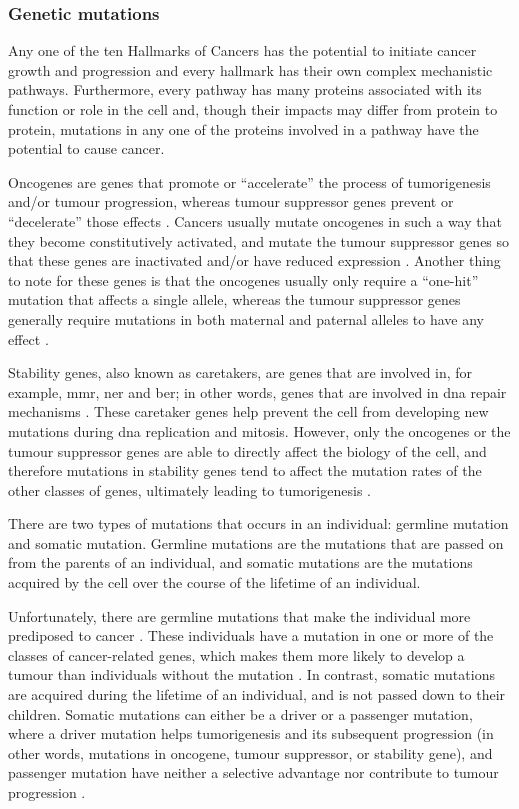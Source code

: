 \subsubsection{Genetic mutations}
\label{ssub:Genetic mutations}

Any one of the ten Hallmarks of Cancers has the potential to initiate cancer growth and progression and every hallmark has their own complex mechanistic pathways.
Furthermore, every pathway has many proteins associated with its function or role in the cell and, though their impacts may differ from protein to protein, mutations in any one of the proteins involved in a pathway have the potential to cause cancer.

Oncogenes are genes that promote or ``accelerate'' the process of tumorigenesis and/or tumour progression, whereas tumour suppressor genes prevent or ``decelerate'' those effects \citep{Vogelstein2004a}.
Cancers usually mutate oncogenes in such a way that they become constitutively activated, and mutate the tumour suppressor genes so that these genes are inactivated and/or have reduced expression \citep{Vogelstein2004a}.
Another thing to note for these genes is that the oncogenes usually only require a ``one-hit'' mutation that affects a single allele, whereas the tumour suppressor genes generally require mutations in both maternal and paternal alleles to have any effect \citep{Stratton2009,Vogelstein2004a}.

Stability genes, also known as caretakers, are genes that are involved in, for example,  \gls{mmr}, \gls{ner} and \gls{ber}; in other words, genes that are involved in \acrshort{dna} repair mechanisms \citep{Vogelstein2004a}.
These caretaker genes help prevent the cell from developing new mutations during \acrshort{dna} replication and mitosis.
However, only the oncogenes or the tumour suppressor genes are able to directly affect the biology of the cell, and therefore mutations in stability genes tend to affect the mutation rates of the other classes of genes, ultimately leading to tumorigenesis \citep{Vogelstein2004a}.

There are two types of mutations that occurs in an individual: germline mutation and somatic mutation.
Germline mutations are the mutations that are passed on from the parents of an individual, and somatic mutations are the mutations acquired by the cell over the course of the lifetime of an individual.

Unfortunately, there are germline mutations that make the individual more prediposed to cancer \citep{Vogelstein2004a}.
These individuals have a mutation in one or more of the classes of cancer-related genes, which makes them more likely to develop a tumour than individuals without the mutation \citep{Vogelstein2004a}.
In contrast, somatic mutations are acquired during the lifetime of an individual, and is not passed down to their children.
Somatic mutations can either be a driver or a passenger mutation, where a driver mutation helps tumorigenesis and its subsequent progression (in other words, mutations in oncogene, tumour suppressor, or stability gene), and passenger mutation have neither a selective advantage nor contribute to tumour progression \citep{Stratton2009}.

